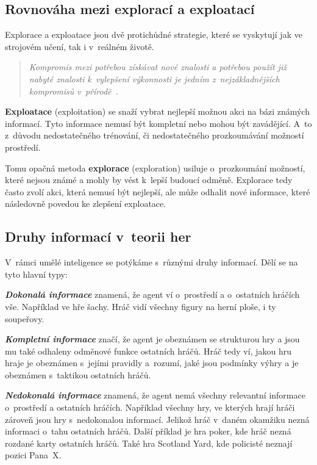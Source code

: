 \subsection{Rovnováha mezi explorací a exploatací}
\label{subsec:exploration-exploitation-dillemma}
Explorace a exploatace jsou dvě protichůdné strategie, které se vyskytují jak ve strojovém učení, tak i v~reálném životě.
\begin{quote}
  \emph{Kompromis mezi potřebou získávat nové znalosti a potřebou použít již nabyté znalosti k~vylepšení výkonnosti je jedním z~nejzákladnějších kompromisů v~přírodě~\cite{Exploitation_Exploration}.}
\end{quote}


\textbf{Exploatace} (exploitation) se snaží vybrat nejlepší možnou akci na bázi známých informací.
Tyto informace nemusí být kompletní nebo mohou být zavádějící.
A~to z~důvodu nedostatečného trénování, či nedostatečného prozkoumávání možností prostředí.

Tomu opačná metoda \textbf{explorace} (exploration) usiluje o~prozkoumání možností, které nejsou známé a mohly by vést k~lepší budoucí odměně.
Explorace tedy často zvolí akci, která nemusí být nejlepší, ale může odhalit nové informace, které následovně povedou ke zlepšení exploatace.

\subsection{Druhy informací v~teorii her}\label{subsec:druhy-informaci-v-teorii-her}
V~rámci umělé inteligence se potýkáme s~různými druhy informací.
Dělí se na tyto hlavní typy:

\textbf{\emph{Dokonalá informace}} znamená, že agent ví o~prostředí a o~ostatních hráčích vše.
Například ve hře šachy.
Hráč vidí všechny figury na herní ploše, i ty soupeřovy.

\textbf{\emph{Kompletní informace}} značí, že agent je obeznámen se strukturou hry a jsou mu také odhaleny odměnové funkce ostatních hráčů.
Hráč tedy ví, jakou hru hraje je obeznámen s~jejími pravidly a~rozumí, jaké jsou podmínky výhry a je obeznámen s~taktikou ostatních hráčů.

\textbf{\emph{Nedokonalá informace}} znamená, že agent nemá všechny relevantní informace o~prostředí a ostatních hráčích.
Například všechny hry, ve kterých hrají hráči zároveň jsou hry s~nedokonalou informací.
Jelikož hráč v~daném okamžiku nezná informaci o~tahu ostatních hráčů.
Další příklad je hra poker, kde hráč nezná rozdané karty ostatních hráčů.
Také hra Scotland Yard, kde policisté neznají pozici Pana~X\@.

